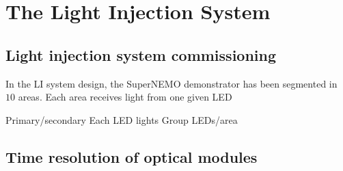 \section{The Light Injection System}
\label{sec:LIS}



\subsection{Light injection system commissioning}


In the LI system design, the SuperNEMO demonstrator has been segmented in $10$ areas.
Each area receives light from one given LED

Primary/secondary
Each LED lights
Group LEDs/area



\subsection{Time resolution of optical modules}






